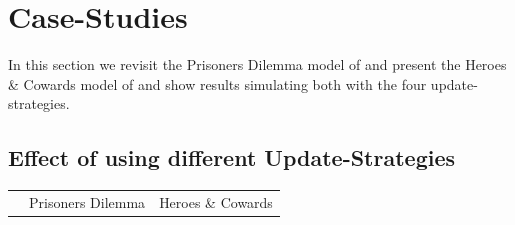 \section{Case-Studies}
In this section we revisit the Prisoners Dilemma model of \cite{nowak_evolutionary_1992} and present the Heroes \& Cowards model of \cite{wilensky_introduction_2015} and show results simulating both with the four update-strategies. 

\subsection{Effect of using different Update-Strategies}

\begin{table}[t]
	\begin{tabular}{c c c}
		& Prisoners Dilemma & Heroes \& Cowards \\ 


\end{tabular}
\end{table}
